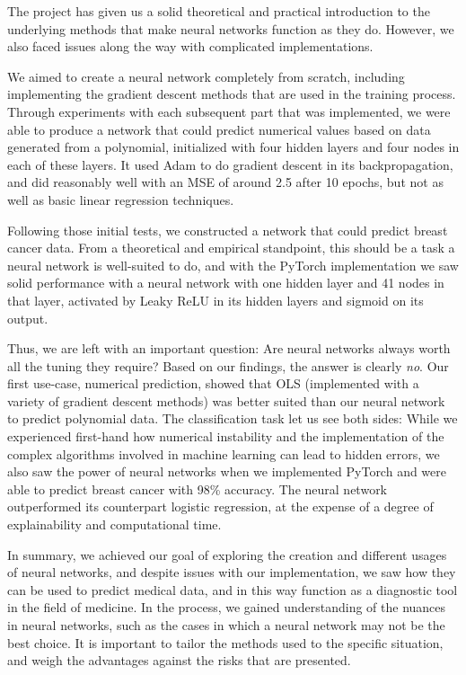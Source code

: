 The project has given us a solid theoretical and practical introduction to the underlying methods that make neural networks function as they do. However, we also faced issues along the way with complicated implementations.

We aimed to create a neural network completely from scratch, including implementing the gradient descent methods that are used in the training process. Through experiments with each subsequent part that was implemented, we were able to produce a network that could predict numerical values based on data generated from a polynomial, initialized with four hidden layers and four nodes in each of these layers. It used Adam to do gradient descent in its backpropagation, and did reasonably well with an MSE of around 2.5 after 10 epochs, but not as well as basic linear regression techniques. 

Following those initial tests, we constructed a network that could predict breast cancer data. From a theoretical and empirical standpoint, this should be a task a neural network is well-suited to do, and with the PyTorch implementation we saw solid performance with a neural network with one hidden layer and 41 nodes in that layer, activated by Leaky ReLU in its hidden layers and sigmoid on its output.

Thus, we are left with an important question: Are neural networks always worth all the tuning they require? Based on our findings, the answer is clearly \emph{no}. Our first use-case, numerical prediction, showed that OLS (implemented with a variety of gradient descent methods) was better suited than our neural network to predict polynomial data. The classification task let us see both sides: While we experienced first-hand how numerical instability and the implementation of the complex algorithms involved in machine learning can lead to hidden errors, we also saw the power of neural networks when we implemented PyTorch and were able to predict breast cancer with 98\% accuracy. The neural network outperformed its counterpart logistic regression, at the expense of a degree of explainability and computational time. 

In summary, we achieved our goal of exploring the creation and different usages of neural networks, and despite issues with our implementation, we saw how they can be used to predict medical data, and in this way function as a diagnostic tool in the field of medicine. In the process, we gained understanding of the nuances in neural networks, such as the cases in which a neural network may not be the best choice. It is important to tailor the methods used to the specific situation, and weigh the advantages against the risks that are presented.